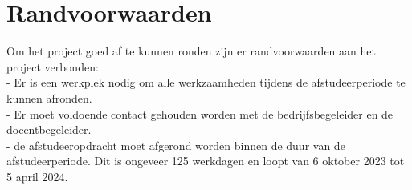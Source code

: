 \section{Randvoorwaarden}
Om het project goed af te kunnen ronden zijn er randvoorwaarden aan het project verbonden: \\
- Er is een werkplek nodig om alle werkzaamheden tijdens de afstudeerperiode te kunnen afronden.\\
- Er moet voldoende contact gehouden worden met de bedrijfsbegeleider en de docentbegeleider. \\ 
- de afstudeeropdracht moet afgerond worden binnen de duur van de afstudeerperiode. 
Dit is ongeveer 125 werkdagen en loopt van 6 oktober 2023 tot 5 april 2024.
